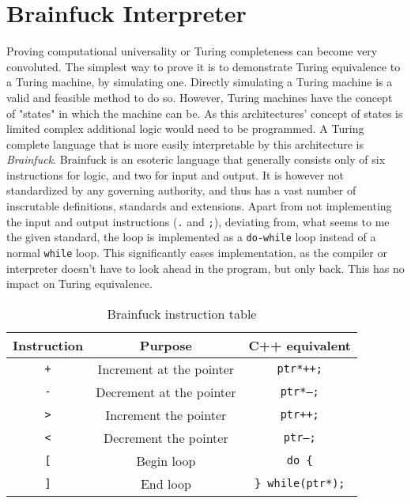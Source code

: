 \section{Brainfuck Interpreter}
Proving computational universality or Turing completeness can become very convoluted. The simplest way to prove it is to demonstrate Turing equivalence to a Turing machine, by simulating one. Directly simulating a Turing machine is a valid and feasible method to do so. However, Turing machines have the concept of "states" in which the machine can be. As this architectures' concept of states is limited complex additional logic would need to be programmed. A Turing complete language that is more easily interpretable by this architecture is \textit{Brainfuck}. Brainfuck is an esoteric language that generally consists only of six instructions for logic, and two for input and output. It is however not standardized by any governing authority, and thus has a vast number of inscrutable definitions, standards and extensions. Apart from not implementing the input and output instructions (\texttt{.} and \texttt{;}), deviating from, what seems to me the given standard, the loop is implemented as a \texttt{do-while} loop instead of a normal \texttt{while} loop. This significantly eases implementation, as the compiler or interpreter doesn't have to look ahead in the program, but only back. This has no impact on Turing equivalence. 

\begin{table}[H]
\begin{center}
\begin{tabular}{ccc}
Instruction    & Purpose                  & C++ equivalent                       \\ \hline
\texttt{+}             & Increment at the pointer & \texttt{ptr*++;}                   \\
\texttt{-}               & Decrement at the pointer & \texttt{ptr*--;}                   \\
\texttt{\textgreater{}} & Increment the pointer    & \texttt{ptr++;}                    \\
\texttt{\textless{}}   & Decrement the pointer    & \texttt{ptr--;}                    \\
\texttt{{[}}            & Begin loop               & \texttt{do \{}                     \\
\texttt{{]}}            & End loop              & \texttt{\} while(ptr*);}
\end{tabular}
\end{center}
\caption{Brainfuck instruction table}
\label{tab:brainfuck-instructions}
\end{table}

